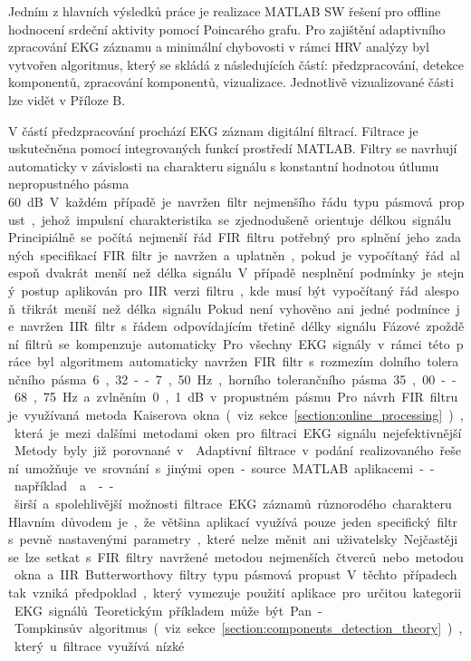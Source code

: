 Jedním z hlavních výsledků práce je realizace MATLAB SW řešení pro offline
hodnocení srdeční aktivity pomocí Poincarého grafu. Pro zajištění adaptivního
zpracování EKG záznamu a minimální chybovosti v rámci HRV analýzy byl vytvořen
algoritmus, který se skládá z následujících částí: předzpracování, detekce
komponentů, zpracování komponentů, vizualizace. Jednotlivě vizualizované části
lze vidět v Příloze B.

V částí předzpracování prochází EKG záznam digitální filtrací. Filtrace je
uskutečněna pomocí integrovaných funkcí prostředí MATLAB. Filtry se
navrhují automaticky v závislosti na charakteru signálu s konstantní hodnotou
útlumu nepropustného pásma 60~\si\dB. V každém případě je navržen filtr
nejmenšího řádu typu pásmová propust, jehož impulsní charakteristika se
zjednodušeně orientuje délkou signálu. Principiálně se počítá nejmenší řád FIR
filtru potřebný pro splnění jeho zadaných specifikací. FIR filtr je navržen a
uplatněn, pokud je vypočítaný řád alespoň dvakrát menší než délka signálu. V
případě nesplnění podmínky je stejný postup aplikován pro IIR verzi filtru, kde
musí být vypočítaný řád alespoň třikrát menší než délka signálu. Pokud není
vyhověno ani jedné podmínce je navržen IIR filtr s řádem odpovídajícím třetině
délky signálu. Fázové zpoždění filtrů se kompenzuje automaticky. Pro všechny EKG
signály v rámci této práce byl algoritmem automaticky navržen FIR filtr s
rozmezím dolního tolerančního pásma 6,32--7,50~\si\Hz, horního tolerančního
pásma 35,00--68,75~\si\Hz~a zvlněním 0,1~\si\dB~v propustném pásmu. Pro návrh
FIR filtru je využívaná metoda Kaiserova okna (viz
sekce~\ref{section:online_processing}), která je mezi dalšími metodami oken pro
filtraci EKG signálu nejefektivnější. Metody byly již porovnané v
\cite{Kumar2014,Lakhwani2013,Yadav2011}. Adaptivní filtrace v podání
realizovaného řešení umožňuje ve srovnání s jinými open-source MATLAB
aplikacemi -- například~\cite{ecgkit}~a~\cite{Sedghamiz2018} -- širší a
spolehlivější možnosti filtrace EKG záznamů různorodého charakteru. Hlavním
důvodem je, že většina aplikací využívá pouze jeden specifický filtr s pevně
nastavenými parametry, které nelze měnit ani uživatelsky. Nejčastěji se lze
setkat s FIR filtry navržené metodou nejmenších čtverců nebo metodou okna a IIR
Butterworthovy filtry typu pásmová propust. V těchto případech tak vzniká
předpoklad, který vymezuje použití aplikace pro určitou kategorii EKG signálů.
Teoretickým příkladem může být Pan-Tompkinsův algoritmus (viz
sekce~\ref{section:components_detection_theory}), který u filtrace využívá nízké

